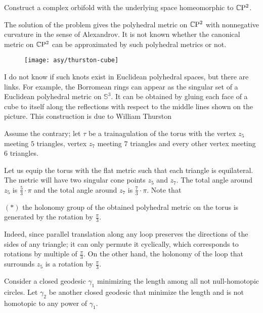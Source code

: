 \begin{pr}
Construct a complex orbifold with the underlying space homeomorphic to $\mathbb{C}\mathrm{P}^2$. 
\end{pr}

The solution of the problem gives the polyhedral metric on $\mathbb{C}\mathrm{P}^2$ with nonnegative curvature in the sense of Alexandrov.
It is not known whether the canonical metric on $\mathbb{C}\mathrm{P}^2$ can be approximated by such polyhedral metrics or not.


\begin{wrapfigure}{r}{23 mm}
\vskip-4mm
\centering
\texttt{[image: asy/thurston-cube]}
\end{wrapfigure}

I do not know if such knots exist in Euclidean polyhedral spaces, but there are links.
For example, the Borromean rings can appear as the singular set of a Euclidean polyhedral metric on $\mathbb S^3$.
It can be obtained by gluing each face of a cube to itself
along the reflections with respect to the middle lines shown on the picture. 
This construction is due to William Thurston \cite{thurston}



Assume the contrary;
let $\tau$ be a trainagulation of the torus with the vertex $z_5$ meeting $5$ triangles,
vertex $z_7$ meeting $7$ triangles 
and every other vertex meeting $6$ triangles.

Let us equip the torus with the flat metric such that each triangle is equilateral.
The metric will have two singular cone points $z_5$ and $z_7$.
The total angle around $z_5$ is $\tfrac53\cdot\pi$
and the total angle around $z_7$ is $\tfrac73\cdot\pi$.
Note that

\begin{cl}{$({*})$}
the holonomy group of the obtained polyhedral metric on the torus is generated by the rotation by $\tfrac\pi3$.
\end{cl}

Indeed, since parallel translation along any loop preserves the directions of the sides of any triangle;
it can only permute it cyclically, which corresponds to rotations by multiple of $\tfrac\pi3$. 
On the other hand, the holonomy of the loop that surrounds $z_5$ is a rotation by $\tfrac\pi3$.

Consider a closed geodesic $\gamma_1$ minimizing the length among all not null-homotopic circles.
Let $\gamma_2$ be another closed geodesic that minimize the length and is not homotopic to any power of $\gamma_1$.

